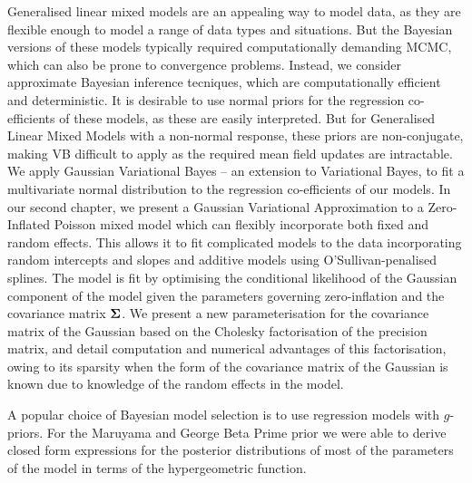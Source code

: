 Generalised linear mixed models are an appealing way to model data, as they are flexible enough to model a
range of data types and situations. But the Bayesian versions of these models typically required 
computationally demanding MCMC, which can also be prone to convergence problems. Instead, we consider approximate Bayesian inference tecniques, which are computationally efficient and deterministic. It is
desirable to use normal priors for the regression co-efficients of these models, as these are easily
interpreted. But for Generalised Linear Mixed Models with a non-normal response, these priors are
non-conjugate, making VB difficult to apply as the required mean field updates are intractable. We apply
Gaussian Variational Bayes -- an extension to Variational Bayes, to fit a multivariate normal distribution
to the regression co-efficients of our models.
In our second chapter, we present a Gaussian Variational Approximation to a Zero-Inflated Poisson mixed model
which can flexibly incorporate both fixed and random effects. This allows it to fit complicated models
to the data incorporating random intercepts and slopes and additive models using O'Sullivan-penalised splines.
The model is fit by optimising the conditional likelihood of the Gaussian component of the model given the
parameters governing zero-inflation and the covariance matrix ${\boldsymbol \Sigma}$.
We present a new parameterisation for the covariance matrix of the Gaussian based on the Cholesky
factorisation of the precision matrix, and detail computation and numerical advantages of this
factorisation, owing to its sparsity when the form of the covariance matrix of the Gaussian is known due to
knowledge of the random effects in the model.


A popular choice of Bayesian model selection is to use regression models with $g$-priors. For the Maruyama
and George Beta Prime prior \citep{Maruyama2011} we were able to derive closed form expressions for the
posterior distributions of most of the parameters of the model in terms of the hypergeometric function.



